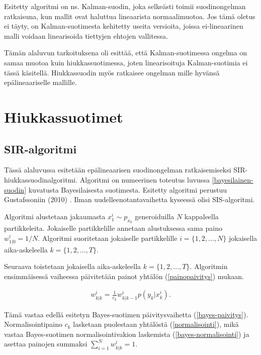 \documentclass[
  12pt,
  a4paper, twoside]{book}
\begin{document}
Esitetty algoritmi on ns. Kalman-suodin, joka selkeästi toimii suodinongelman ratkaisuna, kun mallit ovat haluttua lineaarista normaalimuotoa. Jos tämä oletus ei täyty, on Kalman-suotimesta kehitetty useita versioita, joissa ei-lineaarinen malli voidaan linearisoida tiettyjen ehtojen vallitessa.

Tämän alaluvun tarkoituksena oli esittää, että Kalman-suotimessa ongelma on samaa muotoa kuin hiukkassuotimessa, joten linearisoituja Kalman-suotimia ei tässä käsitellä. Hiukkassuodin myös ratkaisee ongelman mille hyvänsä epälineaariselle mallille.

\chapter{Hiukkassuotimet} \label{hiukkassuotimet}

\section{SIR-algoritmi}

Tässä alaluvussa esitetään epälineaarisen suodinongelman ratkaisemiseksi SIR-hiukkassuodinalgoritmi. Algoritmi on numeerinen toteutus luvussa \ref{bayesilainen-suodin} kuvatusta Bayesilaisesta suotimesta. Esitetty algoritmi perustuu Gustafssoniin (2010) \citep{gustafsson-2010}. Ilman uudelleenotantavaihetta kyseessä olisi SIS-algoritmi.

Algoritmi alustetaan jakaumasta \(x_1^i\sim p_{x_0}\) generoiduilla \(N\) kappaleella partikkeleita. Jokaiselle partikkelille annetaan alustuksessa sama paino \(w_{1|0}^i=1/N\). Algoritmi suoritetaan jokaiselle partikkelille \(i=\{1,2,\ldots,N\}\) jokaisella aika-askeleella \(k=\{1,2,\ldots,T\}\).

Seuraava toistetaan jokaisella aika-askeleella \(k=\{1,2,\ldots,T\}\). Algoritmin ensimmäisessä vaiheessa päivitetään painot yhtälön (\ref{painopaivitys}) mukaan.

\begin{align}\label{painopaivitys}
w^i_{k|k}=\frac{1}{c_k}w^i_{k|k-1}p(y_k|x^i_k).
\end{align}

\noindent Tämä vastaa edellä esitetyn Bayes-suotimen päivitysvaihetta (\ref{bayes-paivitys}). Normalisointipaino \(c_k\) lasketaan puolestaan yhtälöstä (\ref{normalisointi}), mikä vastaa Bayes-suotimen normalisointivakion laskemista (\ref{bayes-normalisointi}) ja asettaa painojen summaksi \(\sum_{i=1}^Nw^i_{k|k}=1\).
\end{document}
